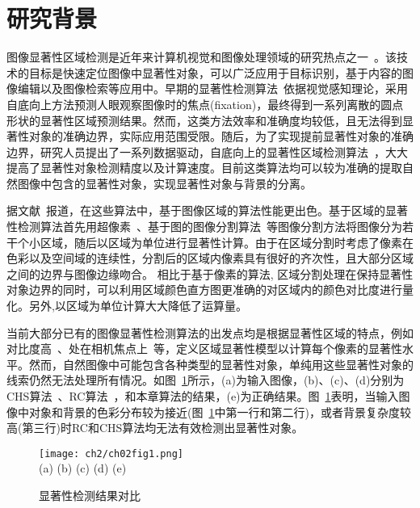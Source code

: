 \section{研究背景}
\label{sec:background}
图像显著性区域检测是近年来计算机视觉和图像处理领域的研究热点之一~\cite{saliencySurvey}。该技术的目标是快速定位图像中显著性对象，可以广泛应用于目标识别，基于内容的图像编辑以及图像检索等应用中。早期的显著性检测算法~\cite{itti}依据视觉感知理论，采用自底向上方法预测人眼观察图像时的焦点(fixation)，最终得到一系列离散的圆点形状的显著性区域预测结果。然而，这类方法效率和准确度均较低，且无法得到显著性对象的准确边界，实际应用范围受限。随后，为了实现提前显著性对象的准确边界，研究人员提出了一系列数据驱动，自底向上的显著性区域检测算法~\cite{Achanta08,ChengPAMI,ufo,Yan2014Hierarchical}，大大提高了显著性对象检测精度以及计算速度。目前这类算法均可以较为准确的提取自然图像中包含的显著性对象，实现显著性对象与背景的分离。\par
据文献~报道，在这些算法中，基于图像区域的算法性能更出色。基于区域的显著性检测算法首先用超像素~\cite{SLIC}、基于图的图像分割算法~\cite{graphseg}等图像分割方法将图像分为若干个小区域，随后以区域为单位进行显著性计算。由于在区域分割时考虑了像素在色彩以及空间域的连续性，分割后的区域内像素具有很好的齐次性，且大部分区域之间的边界与图像边缘吻合。 相比于基于像素的算法, 区域分割处理在保持显著性对象边界的同时，可以利用区域颜色直方图更准确的对区域内的颜色对比度进行量化。另外,以区域为单位计算大大降低了运算量。\par
当前大部分已有的图像显著性检测算法的出发点均是根据显著性区域的特点，例如对比度高~\cite{ChengPAMI}、处在相机焦点上~\cite{ufo}等，定义区域显著性模型以计算每个像素的显著性水平。然而，自然图像中可能包含各种类型的显著性对象，单纯用这些显著性对象的线索仍然无法处理所有情况。如图~\ref{fig:saliencyCom}所示，(a)为输入图像，(b)、(c)、(d)分别为CHS算法~\cite{Yan2014Hierarchical}、RC算法~\cite{ChengPAMI}，和本章算法的结果，(e)为正确结果。图~\ref{fig:saliencyCom}表明，当输入图像中对象和背景的色彩分布较为接近(图~\ref{fig:saliencyCom}中第一行和第二行)，或者背景复杂度较高(第三行)时RC和CHS算法均无法有效检测出显著性对象。
\begin{figure}[htb]
  \centering%
      {\texttt{[image: ch2/ch02fig1.png]}}\\
(a)\quad\quad\quad\quad\quad
(b)\quad\quad\quad\quad\quad\quad
(c)\quad\quad\quad\quad\quad\quad
(d)\quad\quad\quad\quad\quad
(e)
  \caption{显著性检测结果对比}
  \label{fig:saliencyCom}
\end{figure}

